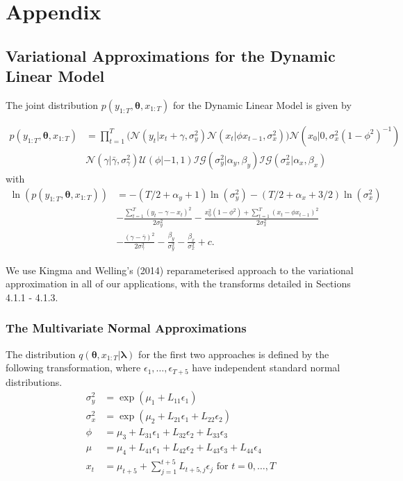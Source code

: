 \documentclass[12pt,a4paper]{article}%
\numberwithin{equation}{section}
\begin{document}
\newpage
\section{Appendix}

\subsection{Variational Approximations for the Dynamic Linear Model}

The joint distribution $p(y_{1:T}, \boldsymbol{\theta}, x_{1:T})$ for the Dynamic Linear Model is given by

\begin{align}
p(y_{1:T}, \boldsymbol{\theta}, x_{1:T}) &= \prod_{t=1}^{T} \bigg( \mathcal{N}(y_t | x_t + \gamma, \sigma^2_y) \mathcal{N}(x_t | \phi x_{t-1}, \sigma^2_x) \bigg) \mathcal{N}(x_0 | 0, \sigma^2_x (1 - \phi^2)^{-1}) \nonumber \\
&\mathcal{N}(\gamma | \bar{\gamma}, \sigma^2_{\gamma}) \mathcal{U}(\phi | -1, 1) \mathcal{IG}(\sigma^2_y | \alpha_y, \beta_y)\mathcal{IG}(\sigma^2_x | \alpha_x, \beta_x) 
\end{align}
with 
\begin{align}
\ln(p(y_{1:T}, \boldsymbol{\theta}, x_{1:T})) &= -(T/2 + \alpha_y + 1) \ln(\sigma_y^2) -(T/2 + \alpha_x + 3/2) \ln(\sigma_x^2) \nonumber \\
&- \frac{\sum_{t=1}^{T}(y_t - \gamma - x_t)^2}{2 \sigma^2_y} - \frac{x_0^2(1 -\phi^2) + \sum_{t=1}^{T}(x_t - \phi x_{t-1})^2}{2 \sigma^2_x} \nonumber \\
&- \frac{(\gamma - \bar{\gamma})^2}{2 \sigma^2_{\gamma}} - \frac{\beta_y}{\sigma^2_y} - \frac{\beta_x}{\sigma^2_x} + c \label{logjoint}. 
\end{align}

We use Kingma and Welling's (2014) reparameterised approach to the variational approximation in all of our applications, with the transforms detailed in Sections 4.1.1 - 4.1.3.

\subsubsection{The Multivariate Normal Approximations}

The distribution $q(\boldsymbol{\theta}, x_{1:T} | \boldsymbol{\lambda})$ for the first two approaches is defined by the following transformation, where $\epsilon_{1}, \dots, \epsilon_{T+5}$ have independent standard normal distributions.
\begin{align}
\sigma^2_y &= \exp(\mu_1 + L_{11} \epsilon_1)  \label{transform1} \\
\sigma^2_x &= \exp(\mu_2 + L_{21} \epsilon_1 + L_{22} \epsilon_2) \label{transform2} \\
\phi &= \mu_3 + L_{31} \epsilon_1 + L_{32} \epsilon_2 + L_{33} \epsilon_3 \label{transform3} \\
\mu &= \mu_4 + L_{41} \epsilon_1 + L_{42} \epsilon_2 + L_{43} \epsilon_3 + L_{44} \epsilon_4 \label{transform4} \\
x_t &= \mu_{t+5} + \sum_{j=1}^{t+5} L_{t+5, j} \epsilon_j \mbox{ for } t = 0, \dots, T \label{transform5} 
\end{align}
\end{document}

